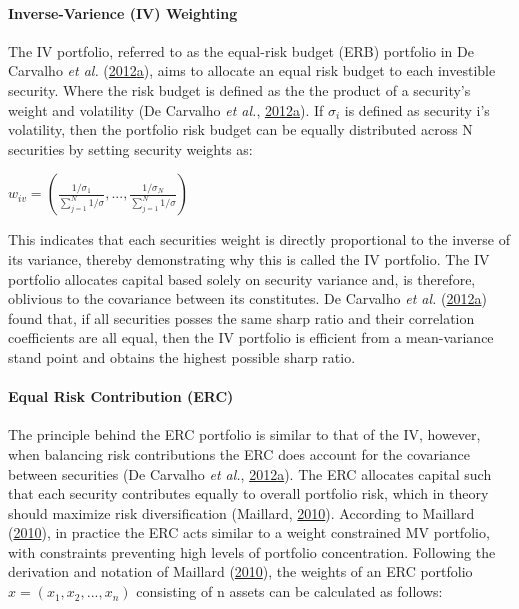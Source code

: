 \documentclass[11pt,preprint, authoryear]{elsarticle}
\numberwithin{equation}{section}
\numberwithin{figure}{section}
\numberwithin{table}{section}
\begin{document}
\hypertarget{inverse-varience-iv-weighting}{%
\paragraph{Inverse-Varience (IV)
Weighting}\label{inverse-varience-iv-weighting}}

The IV portfolio, referred to as the equal-risk budget (ERB) portfolio
in De Carvalho \emph{et al.}
(\protect\hyperlink{ref-leote}{2012}\protect\hyperlink{ref-leote}{a}),
aims to allocate an equal risk budget to each investible security. Where
the risk budget is defined as the the product of a security's weight and
volatility (De Carvalho \emph{et al.},
\protect\hyperlink{ref-leote}{2012}\protect\hyperlink{ref-leote}{a}). If
\(\sigma_i\) is defined as security i's volatility, then the portfolio
risk budget can be equally distributed across N securities by setting
security weights as:

\begin{center} 
$w_{iv}=(\frac{1/\sigma_1}{\sum^N_{j=1} 1/\sigma}, ...,\frac{1/\sigma_N}{\sum^N_{j=1} 1/\sigma} )$ 
\end{center}

This indicates that each securities weight is directly proportional to
the inverse of its variance, thereby demonstrating why this is called
the IV portfolio. The IV portfolio allocates capital based solely on
security variance and, is therefore, oblivious to the covariance between
its constitutes. De Carvalho \emph{et al.}
(\protect\hyperlink{ref-leote}{2012}\protect\hyperlink{ref-leote}{a})
found that, if all securities posses the same sharp ratio and their
correlation coefficients are all equal, then the IV portfolio is
efficient from a mean-variance stand point and obtains the highest
possible sharp ratio.

\hypertarget{equal-risk-contribution-erc}{%
\paragraph{Equal Risk Contribution
(ERC)}\label{equal-risk-contribution-erc}}

The principle behind the ERC portfolio is similar to that of the IV,
however, when balancing risk contributions the ERC does account for the
covariance between securities (De Carvalho \emph{et al.},
\protect\hyperlink{ref-leote}{2012}\protect\hyperlink{ref-leote}{a}).
The ERC allocates capital such that each security contributes equally to
overall portfolio risk, which in theory should maximize risk
diversification (Maillard, \protect\hyperlink{ref-maillard2010}{2010}).
According to Maillard (\protect\hyperlink{ref-maillard2010}{2010}), in
practice the ERC acts similar to a weight constrained MV portfolio, with
constraints preventing high levels of portfolio concentration. Following
the derivation and notation of Maillard
(\protect\hyperlink{ref-maillard2010}{2010}), the weights of an ERC
portfolio \(x=(x_1,x_2,...,x_n)\) consisting of n assets can be
calculated as follows:
\end{document}
